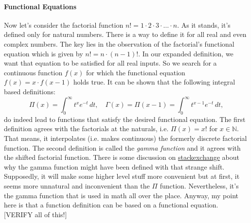 \paragraph{Functional Equations}
Now let's consider the factorial function $n! = 1 \cdot 2 \cdot 3 \cdot \ldots \cdot n$. As it stands, it's defined only for natural numbers. There is a way to define it for all real and even complex numbers. The key lies in the observation of the factorial's functional equation which is given by $n! = n \cdot (n-1)!$. In our expanded definition, we want that equation to be satisfied for all real inputs. So we search for a continuous function $f(x)$ for which the functional equation $f(x) = x \cdot f(x-1)$ holds true. It can be shown that the following integral based definitions:
\begin{equation}
\Pi(x)    = \int_0^\infty t^x e^{-t} \, dt, \quad
\Gamma(x) = \Pi(x-1) = \int_0^\infty t^{x-1} e^{-t} \, dt,
\end{equation}
do indeed lead to functions that satisfy the desired functional equation. The first definition agrees with the factorials at the naturals, i.e. $\Pi(x) = x!$ for $x \in \mathbb{N}$. That means, it interpolates (i.e. makes continuous) the formerly discrete factorial function. The second definition is called the \emph{gamma function} and it agrees with the shifted factorial function. There is some discussion on \href{https://math.stackexchange.com/questions/1362523/why-is-the-gamma-function-off-by-1-from-the-factorial}{stackexchange} about why the gamma function might have been defined with that strange shift. Supposedly, it will make some higher level stuff more convenient but at first, it seems more unnatural and inconvenient than the $\Pi$ function. Nevertheless, it's the gamma function that is used in math all over the place. Anyway, my point here is that a function definition can be based on a functional equation. 
[VERIFY all of this!]


